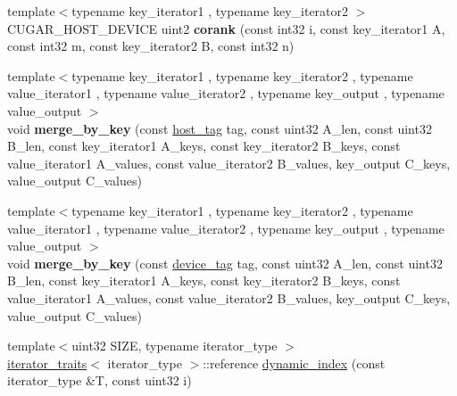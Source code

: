 \begin{DoxyCompactItemize}
\item 
\mbox{\label{namespacecugar_abbc2f27f949b587118d8bcca7a0dead8}} 
{\footnotesize template$<$typename key\+\_\+iterator1 , typename key\+\_\+iterator2 $>$ }\\C\+U\+G\+A\+R\+\_\+\+H\+O\+S\+T\+\_\+\+D\+E\+V\+I\+CE uint2 {\bfseries corank} (const int32 i, const key\+\_\+iterator1 A, const int32 m, const key\+\_\+iterator2 B, const int32 n)
\item 
\mbox{\label{namespacecugar_a770e5b9490849ab553c09d27c926a8f8}} 
{\footnotesize template$<$typename key\+\_\+iterator1 , typename key\+\_\+iterator2 , typename value\+\_\+iterator1 , typename value\+\_\+iterator2 , typename key\+\_\+output , typename value\+\_\+output $>$ }\\void {\bfseries merge\+\_\+by\+\_\+key} (const \hyperlink{structcugar_1_1host__tag}{host\+\_\+tag} tag, const uint32 A\+\_\+len, const uint32 B\+\_\+len, const key\+\_\+iterator1 A\+\_\+keys, const key\+\_\+iterator2 B\+\_\+keys, const value\+\_\+iterator1 A\+\_\+values, const value\+\_\+iterator2 B\+\_\+values, key\+\_\+output C\+\_\+keys, value\+\_\+output C\+\_\+values)
\item 
\mbox{\label{namespacecugar_a0c80cde60c63af4428d59a563cad5056}} 
{\footnotesize template$<$typename key\+\_\+iterator1 , typename key\+\_\+iterator2 , typename value\+\_\+iterator1 , typename value\+\_\+iterator2 , typename key\+\_\+output , typename value\+\_\+output $>$ }\\void {\bfseries merge\+\_\+by\+\_\+key} (const \hyperlink{structcugar_1_1device__tag}{device\+\_\+tag} tag, const uint32 A\+\_\+len, const uint32 B\+\_\+len, const key\+\_\+iterator1 A\+\_\+keys, const key\+\_\+iterator2 B\+\_\+keys, const value\+\_\+iterator1 A\+\_\+values, const value\+\_\+iterator2 B\+\_\+values, key\+\_\+output C\+\_\+keys, value\+\_\+output C\+\_\+values)
\item 
{\footnotesize template$<$uint32 S\+I\+ZE, typename iterator\+\_\+type $>$ }\\\hyperlink{structcugar_1_1iterator__traits}{iterator\+\_\+traits}$<$ iterator\+\_\+type $>$\+::reference \hyperlink{group___register_arrays_module_ga312bfb0737a477266b603285bac022df}{dynamic\+\_\+index} (const iterator\+\_\+type \&T, const uint32 i)
\item 
\mbox{\label{namespacecugar_a24d7d4752ca23e005b67d35ab7a6812f}} 

\end{DoxyCompactItemize}
